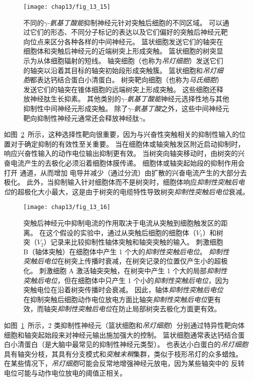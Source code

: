 \begin{figure}[htbp]
	\centering
	\texttt{[image: chap13/fig\_13\_15]}
	\caption{不同的\textit{$\gamma$-氨基丁酸能}抑制神经元针对突触后细胞的不同区域。
		可以通过它们的形态、不同分子标记的表达以及它们偏好的突触后神经元靶向位点来区分各种各样的中间神经元。
		篮状细胞发送它们的轴突在细胞体和突触后神经元的近端树突上形成突触。
		篮状细胞的树突显示为从体细胞辐射的短线。
		轴突细胞（也称为\textit{吊灯细胞}）发送它们的轴突以沿着其目标的轴突初始段形成突触簇。
		篮状细胞和\textit{吊灯细胞}都表达钙结合蛋白小清蛋白。
		树突靶向细胞（也称为\textit{马氏细胞}）发送它们的轴突在锥体细胞的远端树突上形成突触。
		这些细胞还释放神经肽生长抑素。
		其他类别的\textit{$\gamma$-氨基丁酸能}神经元选择性地与其他抑制性中间神经元形成突触。
		除了\textit{$\gamma$-氨基丁酸}之外，这些中间神经元靶向抑制性神经元通常还会释放神经肽$\gamma$。}
	\label{fig:13_15}
\end{figure}


如图~\ref{fig:13_16}~所示，这种选择性靶向很重要，因为与兴奋性突触相关的抑制性输入的位置对于确定抑制的有效性至关重要。
当在细胞体或轴突触发区附近启动抑制时，响应兴奋性输入的动作电位输出抑制更有效。
当树突向轴突移动时，由树突的兴奋电流产生的去极化必须沿着细胞体膜传递。
细胞体或轴突起始段的抑制作用会打开  通道，从而增加  电导并减少（通过分流）由扩散的兴奋电流产生的大部分去极化。
此外，当抑制输入针对细胞体而不是树突时，细胞体响应\textit{抑制性突触后电位}的超极化大小最大，这是由于树突的电缆特性导致树突\textit{抑制性突触后电位}衰减。


\begin{figure}[htbp]
	\centering
	\texttt{[image: chap13/fig\_13\_16]}
	\caption{突触后神经元中抑制电流的作用取决于电流从突触到细胞触发区的距离。
		在这个假设的实验中，通过从突触后细胞的细胞体（$ V_1 $）和树突（$ V_2 $）记录来比较抑制性轴体突触和轴突突触的输入。
		刺激细胞 B（轴体突触）在细胞体中产生 1 个大的\textit{抑制性突触后电位}。
		\textit{抑制性突触后电位}在树突上传播时衰减，在树突记录的位置仅产生小的超极化。
		刺激细胞 A 激活轴突突触，在树突中产生 1 个大的局部\textit{抑制性突触后电位}，但在细胞体中只产生 1 个小的\textit{抑制性突触后电位}，因为突触电位在沿着树突传播时会衰减。
		因此，轴体\textit{抑制性突触后电位}在抑制突触后细胞动作电位放电方面比轴突\textit{抑制性突触后电位}更有效，而轴突\textit{抑制性突触后电位}在防止局部树突去极化方面更有效。}
	\label{fig:13_16}
\end{figure}


如图~\ref{fig:13_15}~所示，2 类抑制性神经元（篮状细胞和\textit{吊灯细胞}）分别通过特异性靶向体细胞和轴突起始段来对神经元输出施加强大的控制。
篮状细胞通常表达钙结合蛋白小清蛋白（是大脑中最常见的抑制性神经元类型）。
也表达小白蛋白的\textit{吊灯细胞}具有轴突分枝，其具有分支模式和\textit{突触末稍}集群，类似于枝形吊灯的众多蜡烛。
在某些情况下，\textit{吊灯细胞}可能会反常地增强神经元放电，因为某些轴突中的  反转电位可能与动作电位放电的阈值正相关。



